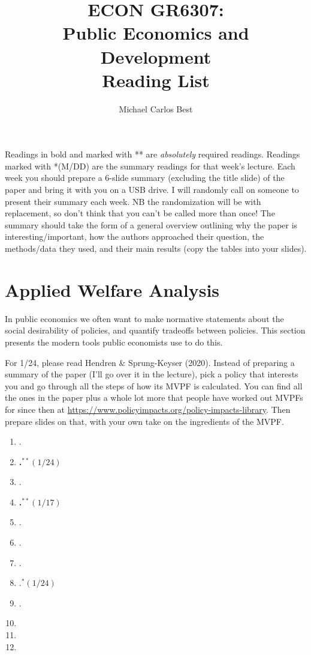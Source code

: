\documentclass[11pt]{article}
\begin{document}
\title{ECON GR6307: \\ Public Economics and Development \\ Reading List}
\author{Michael Carlos Best}

\maketitle

Readings in bold and marked with ** are \textit{absolutely} required readings. Readings marked with *(M/DD) are the summary readings for that week's lecture. Each week you should prepare a 6-slide summary (excluding the title slide) of the paper and bring it with you on a USB drive. I will randomly call on someone to present their summary each week. NB the randomization will be with replacement, so don't think that you can't be called more than once! The summary should take the form of a general overview outlining why the paper is interesting/important, how the authors approached their question, the methods/data they used, and their main results (copy the tables into your slides).

\section{Applied Welfare Analysis}

In public economics we often want to make normative statements about the social desirability of policies, and quantify tradeoffs between policies. This section presents the modern tools public economists use to do this. 

For 1/24, please read Hendren \& Sprung-Keyser (2020). Instead of preparing a summary of the paper (I'll go over it in the lecture), pick a policy that interests you and go through all the steps of how its MVPF is calculated. You can find all the ones in the paper plus a whole lot more that people have worked out MVPFs for since then at \url{https://www.policyimpacts.org/policy-impacts-library}. Then prepare slides on that, with your own take on the ingredients of the MVPF.

\begin{enumerate}
\item {}.
\item \textbf{.$^{**}(1/24)$}
\item {}.
\item \textbf{.$^{**}(1/17)$}
\item {}.
\item {}.
\item {}.
\item {}.$^{*}(1/24)$
\item {}.
\item {}
\item {}
\item {}
\end{enumerate}
\end{document}
